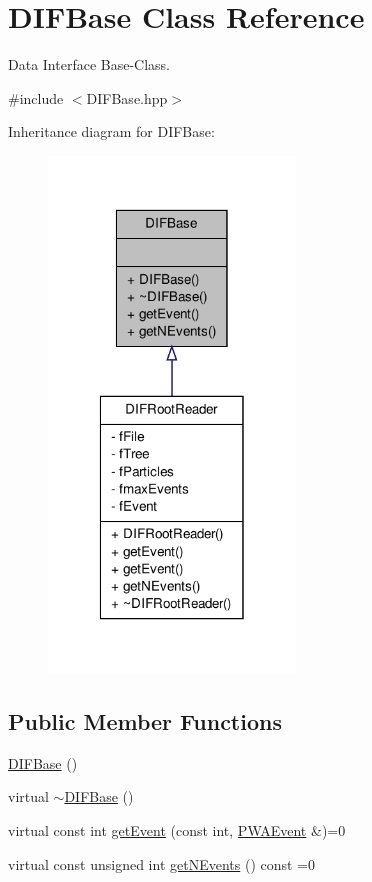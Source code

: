 \hypertarget{classDIFBase}{
\section{DIFBase Class Reference}
\label{d9/db5/classDIFBase}
}


Data Interface Base-\/Class.  




{\ttfamily \#include $<$DIFBase.hpp$>$}



Inheritance diagram for DIFBase:\nopagebreak
\begin{figure}[H]
\begin{center}
\leavevmode
\includegraphics[width=186pt]{da/d1e/classDIFBase__inherit__graph}
\end{center}
\end{figure}
\subsection*{Public Member Functions}
\begin{DoxyCompactItemize}
\item 
\hyperlink{classDIFBase_acbbc1c92aa68251a8bc21a49d3c23374}{DIFBase} ()
\item 
virtual \hyperlink{classDIFBase_a36a102f92fd77b49a88274b88d150905}{$\sim$DIFBase} ()
\item 
virtual const int \hyperlink{classDIFBase_ab31cfae817f0420fa6a7b8b2cc013baa}{getEvent} (const int, \hyperlink{classPWAEvent}{PWAEvent} \&)=0
\item 
virtual const unsigned int \hyperlink{classDIFBase_a69e359ba0221a1b7bb32cdcbb819d56a}{getNEvents} () const =0
\end{DoxyCompactItemize}


